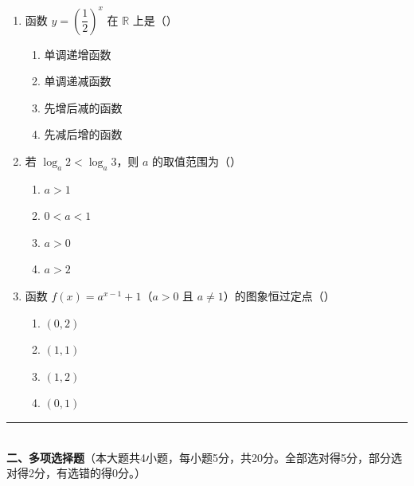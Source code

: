 \documentclass[12pt, a4paper]{ctexart}
\begin{document}
\begin{enumerate}
\item 函数 $y=\left(\dfrac{1}{2}\right)^x$ 在 $\mathbb{R}$ 上是（\quad）
  \begin{enumerate}[label=\Alph*., itemsep=0pt]
    \item 单调递增函数 \quad \item 单调递减函数
    \item 先增后减的函数 \quad \item 先减后增的函数
  \end{enumerate}

\item 若 $\log_a 2<\log_a 3$，则 $a$ 的取值范围为（\quad）
  \begin{enumerate}[label=\Alph*., itemsep=0pt]
    \item $a>1$ \quad \item $0<a<1$
    \item $a>0$ \quad \item $a>2$
  \end{enumerate}

\item 函数 $f(x)=a^{x-1}+1$（$a>0$ 且 $a\neq 1$）的图象恒过定点（\quad）
  \begin{enumerate}[label=\Alph*., itemsep=0pt]
    \item $(0,2)$ \quad \item $(1,1)$ \quad \item $(1,2)$ \quad \item $(0,1)$
  \end{enumerate}
\end{enumerate}

\vspace{6pt}

\noindent\rule{\textwidth}{0.4pt}\\[2pt]
{\large\bfseries 二、多项选择题}（本大题共4小题，每小题5分，共20分。全部选对得5分，部分选对得2分，有选错的得0分。）

\vspace{6pt}
\end{document}
